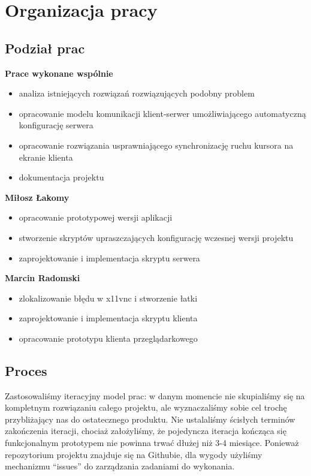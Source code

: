   \vfill

\section{Organizacja pracy}

  \subsection{Podział prac}

    \textbf{Prace wykonane wspólnie}
    \begin{itemize}[noitemsep]
      \item analiza istniejących rozwiązań rozwiązujących podobny problem
      \item opracowanie modelu komunikacji klient-serwer umożliwiającego automatyczną konfigurację serwera
      \item opracowanie rozwiązania usprawniającego synchronizację ruchu kursora na ekranie klienta
      \item dokumentacja projektu
    \end{itemize}

    \noindent
    \textbf{Miłosz Łakomy}
    \begin{itemize}[noitemsep]
      \item opracowanie prototypowej wersji aplikacji
      \item stworzenie skryptów upraszczających konfigurację wczesnej wersji projektu
      \item zaprojektowanie i implementacja skryptu serwera
    \end{itemize}

    \noindent
    \textbf{Marcin Radomski}
    \begin{itemize}[noitemsep]
      \item zlokalizowanie błędu w x11vnc i stworzenie łatki
      \item zaprojektowanie i implementacja skryptu klienta
      \item opracowanie prototypu klienta przeglądarkowego
    \end{itemize}

  \subsection{Proces}

    Zastosowaliśmy iteracyjny model prac: w danym momencie nie skupialiśmy się na kompletnym rozwiązaniu całego projektu, ale wyznaczaliśmy sobie cel trochę przybliżający nas do ostatecznego produktu. Nie ustalaliśmy ścisłych terminów zakończenia iteracji, chociaż założyliśmy, że pojedyncza iteracja kończąca się funkcjonalnym prototypem nie powinna trwać dłużej niż 3-4 miesiące. Ponieważ repozytorium projektu znajduje się na Githubie, dla wygody użyliśmy mechanizmu ``issues'' do zarządzania zadaniami do wykonania.

